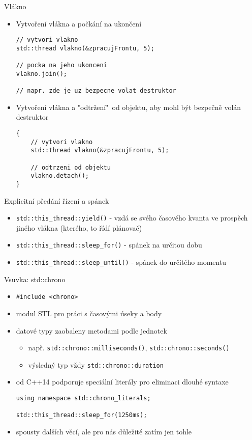 \documentclass{beamer}
\begin{document}
\begin{xframe}{Vlákno}
	\begin{itemize}
		\item Vytvoření vlákna a počkání na ukončení
\begin{lstlisting}[basicstyle=\fontsize{8}{9}\selectfont\ttfamily]
// vytvori vlakno
std::thread vlakno(&zpracujFrontu, 5);

// pocka na jeho ukonceni
vlakno.join();

// napr. zde je uz bezpecne volat destruktor
\end{lstlisting}
		\item Vytvoření vlákna a "odtržení"~od objektu, aby mohl být bezpečně volán destruktor
\begin{lstlisting}[basicstyle=\fontsize{8}{9}\selectfont\ttfamily]
{
    // vytvori vlakno
    std::thread vlakno(&zpracujFrontu, 5);

    // odtrzeni od objektu
    vlakno.detach();
}
\end{lstlisting}
	\end{itemize}
\end{xframe}

\begin{xframe}{Explicitní předání řízení a spánek}
	\begin{itemize}
		\item \texttt{std::this\_thread::yield()} - vzdá se svého časového kvanta ve prospěch jiného vlákna (kterého, to řídí plánovač)
		\item \texttt{std::this\_thread::sleep\_for()} - spánek na určitou dobu
		\item \texttt{std::this\_thread::sleep\_until()} - spánek do určitého momentu
	\end{itemize}
\end{xframe}

\begin{xframe}{Vsuvka: std::chrono}
	\begin{itemize}
		\item \texttt{\#include <chrono>}
		\item modul STL pro práci s časovými úseky a body
		\item datové typy zaobaleny metodami podle jednotek
			\begin{itemize}
				\item např. \texttt{std::chrono::milliseconds()}, \texttt{std::chrono::seconds()}
				\item výsledný typ vždy \texttt{std::chrono::duration}
			\end{itemize}
		\item od C++14 podporuje speciální literály pro eliminaci dlouhé syntaxe
\begin{lstlisting}[basicstyle=\fontsize{8}{9}\selectfont\ttfamily]
using namespace std::chrono_literals;

std::this_thread::sleep_for(1250ms);
\end{lstlisting}
		\item spousty dalších věcí, ale pro nás důležité zatím jen tohle
	\end{itemize}
\end{xframe}
\end{document}
